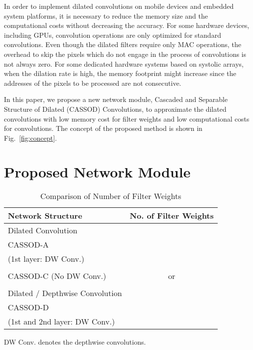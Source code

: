 \documentclass[10pt,twocolumn,letterpaper]{article}
\begin{document}
In order to implement dilated convolutions on mobile devices and embedded system platforms, it is necessary to reduce the memory size and the computational costs without decreasing the accuracy. For some hardware devices, including GPUs, convolution operations are only optimized for standard convolutions. Even though the  dilated filters require only  MAC operations, the overhead to skip the pixels which do not engage in the process of convolutions is not always zero. For some dedicated hardware systems based on systolic arrays, when the dilation rate is high, the memory footprint might increase since the addresses of the pixels to be processed are not consecutive.

In this paper, we propose a new network module, Cascaded and Separable Structure of Dilated (CASSOD) Convolutions, to approximate the  dilated convolutions with low memory cost for filter weights and low computational costs for convolutions. The concept of the proposed method is shown in Fig.~\ref{fig:concept}.





\section{Proposed Network Module}
\label{sec:module}

\begin{table}
\caption{Comparison of Number of Filter Weights}
\begin{center}
\begin{tabular}{l|c}
\hline
Network Structure &  No. of Filter Weights \\
\hline
Dilated Convolution  & \\
\hline
CASSOD-A             & \multirow{2}{*}{}  \\
(1st layer: DW Conv.)\\
\hline
\multirow{3}{*}{CASSOD-C (No DW Conv.)}  &   \\
                     &  or     \\
                     &   \\
\hline
Dilated / Depthwise Convolution  & \\
\hline
CASSOD-D             & \multirow{2}{*}{}  \\
(1st and 2nd layer: DW Conv.)\\           
\hline
\end{tabular}
\end{center}
{\footnotesize
DW Conv. denotes the depthwise convolutions.\\
}
\label{tab:weights}
\end{table}
\end{document}
